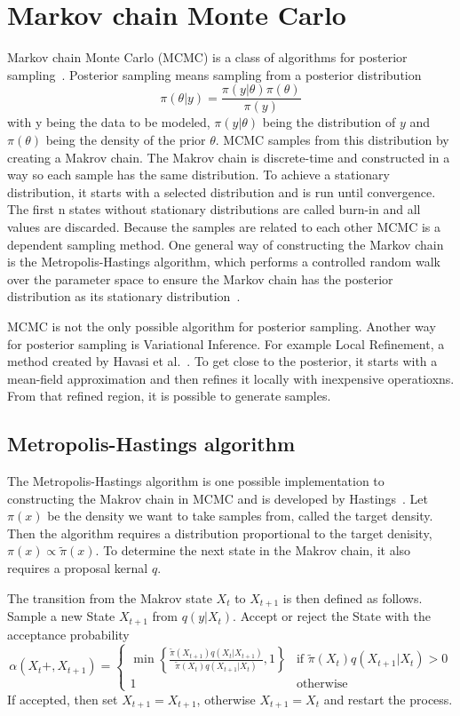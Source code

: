 \section{Markov chain Monte Carlo}
Markov chain Monte Carlo (MCMC) is a class of algorithms 
for posterior sampling~\cite{wang2020brief}. 
Posterior sampling means sampling from a posterior distribution \[
\pi(\theta|y)=\frac{\pi(y|\theta)\pi(\theta)}{\pi(y)}
\]
with y being the data to be modeled, $\pi(y|\theta)$ 
being the distribution of $y$ and $\pi(\theta)$ 
being the density of the prior $\theta$.
MCMC samples from this distribution by creating a Makrov chain. 
The Makrov chain is discrete-time and constructed in a way so each sample 
has the same distribution. To achieve a stationary distribution, 
it starts with a selected distribution and is run until convergence. 
The first n states without stationary distributions are called 
burn-in and all values are discarded. Because the samples are 
related to each other MCMC is a dependent sampling method.
One general way of constructing the Markov chain is the 
Metropolis-Hastings algorithm, which performs a controlled 
random walk over the parameter space to ensure the Markov
chain has the posterior distribution as its stationary distribution~\cite{wang2020brief}. 

MCMC is not the only possible algorithm for posterior sampling. 
Another way for posterior sampling is Variational Inference. 
For example Local Refinement, a method created by 
Havasi et al.~\cite{havasi2021sampling}. 
To get close to the posterior, 
it starts with a mean-field approximation and then refines it 
locally with inexpensive operatioxns. From that refined region, 
it is possible to generate samples.
\subsection{Metropolis-Hastings algorithm}
The Metropolis-Hastings algorithm is one possible implementation to constructing the Makrov chain in MCMC and 
is developed by Hastings~\cite{hastings1970}.
Let $\pi(x)$ be the density we want to take samples from, called the target density.
Then the algorithm requires a distribution proportional to the target denisity, $\pi(x)\propto\tilde{\pi}(x)$.
To determine the next state in the Makrov chain, it also requires a proposal kernal $q$.

The transition from the Makrov state $X_t$ to $X_{t+1}$ is then defined as follows.
Sample a new State  $X_{t+1}$ from $q(y | X_t)$. 
Accept or reject the State with the acceptance probability
\[ 
    \alpha(X_t+, X_{t+1}) = 
    \begin{cases}
        \min \left\{ \frac{\tilde{\pi}(X_{t+1}) q(X_t|X_{t+1} )}{\tilde{\pi}(X_t) q(X_{t+1}|X_t)}, 1 \right\} & \text{if } \tilde{\pi}(X_t)q(X_{t+1}|X_t)>0 \\
        1 & \text{otherwise}
    \end{cases}     
\]
If accepted, then set $X_{t+1}=X_{t+1}$, otherwise $X_{t+1}  = X_t$ and restart the process.

